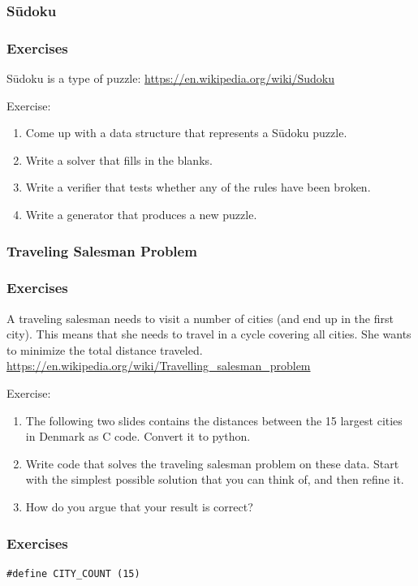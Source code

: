{\subsubsection{Sūdoku}
\begin{frame}[fragile]
    \frametitle{Exercises  }
    \vspace{3mm}
    Sūdoku is a type of puzzle: \url{https://en.wikipedia.org/wiki/Sudoku}
    
    \vspace{5mm}
    Exercise:
    \begin{enumerate}
      \item Come up with a data structure that represents a Sūdoku puzzle.
      \item Write a solver that fills in the blanks.
      \item Write a verifier that tests whether any of the rules have been broken.
      \item Write a generator that produces a new puzzle.
    \end{enumerate}
\end{frame}

\subsubsection{Traveling Salesman Problem}
\begin{frame}[fragile]
    \frametitle{Exercises  }
    \vspace{3mm}
    A traveling salesman needs to visit a number of cities (and end up in the first city). This means that she needs to travel in a cycle covering all cities. She wants to minimize the total distance traveled.\\
    \url{https://en.wikipedia.org/wiki/Travelling_salesman_problem}
    
    \vspace{5mm}
    Exercise:
    \begin{enumerate}
      \item The following two slides contains the distances between the 15 largest cities in Denmark as C code. Convert it to python.
      \item Write code that solves the traveling salesman problem on these data. Start with the simplest possible solution that you can think of, and then refine it.
      \item How do you argue that your result is correct?
    \end{enumerate}
\end{frame}
\begin{frame}[fragile]
    \frametitle{Exercises  }
    \vspace{-2mm}
    \begin{verbatim}
#define CITY_COUNT (15)


\end{verbatim}
\end{frame}}

